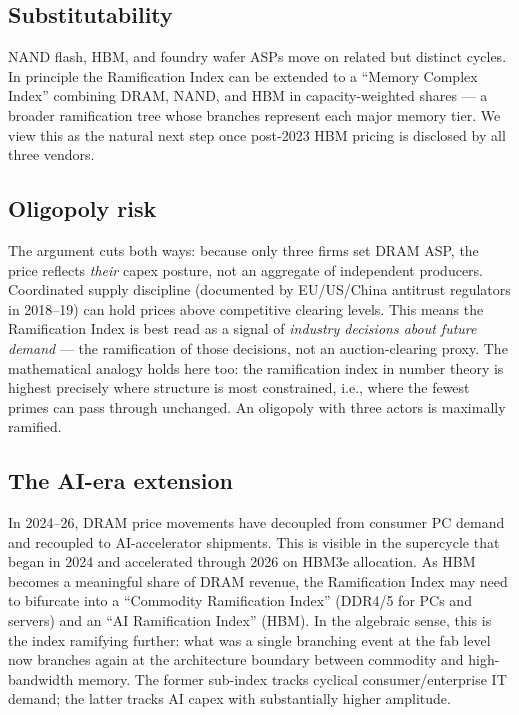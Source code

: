 \documentclass[11pt,a4paper]{article}
\begin{document}
\subsection{Substitutability}

NAND flash, HBM, and foundry wafer ASPs move on related but distinct cycles. In principle the Ramification Index can be extended to a ``Memory Complex Index'' combining DRAM, NAND, and HBM in capacity-weighted shares --- a broader ramification tree whose branches represent each major memory tier. We view this as the natural next step once post-2023 HBM pricing is disclosed by all three vendors.

\subsection{Oligopoly risk}

The argument cuts both ways: because only three firms set DRAM ASP, the price reflects \emph{their} capex posture, not an aggregate of independent producers. Coordinated supply discipline (documented by EU/US/China antitrust regulators in 2018--19) can hold prices above competitive clearing levels. This means the Ramification Index is best read as a signal of \emph{industry decisions about future demand} --- the ramification of those decisions, not an auction-clearing proxy. The mathematical analogy holds here too: the ramification index in number theory is highest precisely where structure is most constrained, i.e., where the fewest primes can pass through unchanged. An oligopoly with three actors is maximally ramified.

\subsection{The AI-era extension}

In 2024--26, DRAM price movements have decoupled from consumer PC demand and recoupled to AI-accelerator shipments. This is visible in the supercycle that began in 2024 and accelerated through 2026 on HBM3e allocation. As HBM becomes a meaningful share of DRAM revenue, the Ramification Index may need to bifurcate into a ``Commodity Ramification Index'' (DDR4/5 for PCs and servers) and an ``AI Ramification Index'' (HBM). In the algebraic sense, this is the index ramifying further: what was a single branching event at the fab level now branches again at the architecture boundary between commodity and high-bandwidth memory. The former sub-index tracks cyclical consumer/enterprise IT demand; the latter tracks AI capex with substantially higher amplitude.
\end{document}
